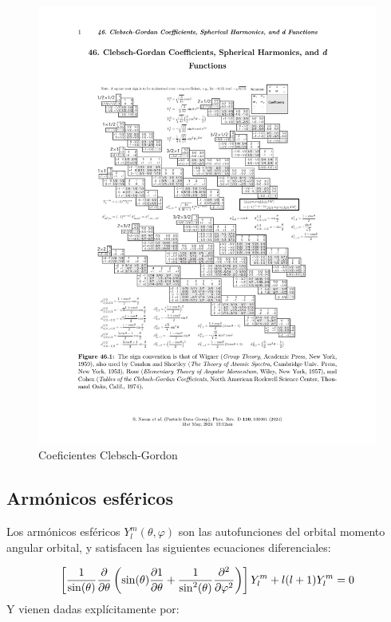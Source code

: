 \begin{figure}[h!] \centering
	\includegraphics[width=1.\linewidth]{Cuerpo/Imagenes/A-Clebsh-Gordon.pdf}
	\caption{Coeficientes Clebsch-Gordon}
\end{figure}

\subsection{Armónicos esféricos}

Los armónicos esféricos $Y_l^m (\theta, \varphi)$ son las autofunciones del orbital momento angular orbital, y satisfacen las siguientes ecuaciones diferenciales:

\begin{equation}
    \left[ \frac{1}{\sin (\theta)} \frac{\partial }{\partial \theta} \left( \sin (\theta) \frac{\partial 1}{\partial \theta} + \frac{1}{\sin^2 (\theta)} \frac{\partial ^2}{\partial \varphi^2} \right) \right] Y_l^m + l(l+1) Y_l^m = 0
\end{equation}
Y vienen dadas explícitamente por:

